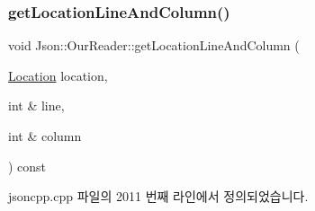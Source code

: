 \subsubsection{\texorpdfstring{get\+Location\+Line\+And\+Column()}{getLocationLineAndColumn()}\hspace{0.1cm}{\footnotesize\ttfamily [1/2]}}
{\footnotesize\ttfamily void Json\+::\+Our\+Reader\+::get\+Location\+Line\+And\+Column (\begin{DoxyParamCaption}\item[{\hyperlink{class_json_1_1_our_reader_a1bdc7bbc52ba87cae6b19746f2ee0189}{Location}}]{location,  }\item[{int \&}]{line,  }\item[{int \&}]{column }\end{DoxyParamCaption}) const\hspace{0.3cm}{\ttfamily [private]}}



jsoncpp.\+cpp 파일의 2011 번째 라인에서 정의되었습니다.


